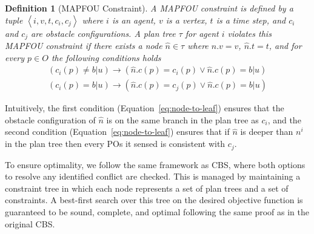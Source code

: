 \documentclass[letterpaper]{article} %
\newcommand{\unknown}{\textit{b}|\textit{u}}
\newcommand{\pos}{POs\xspace}
\newcommand{\tuple}[1]{\ensuremath{\left \langle #1 \right \rangle }}
\newtheorem{definition}{Definition}
\begin{document}
\begin{definition}[MAPFOU Constraint]
A MAPFOU constraint is defined by a tuple $\tuple{i,v,t,c_i,c_j}$
where $i$ is an agent,
$v$ is a vertex,
$t$ is a time step,
and $c_i$ and $c_j$ are obstacle configurations.
A plan tree $\tau$ for agent $i$ violates this MAPFOU constraint if there exists a node $\hat{n}\in\tau$ where $\hat{n}.v=v$,  $\hat{n}.t=t$, and for every $p\in O$ the following conditions holds
\begin{eqnarray}
\left(c_i(p)\neq\unknown\right)\rightarrow \left(\hat{n}.c(p)=c_i(p)\vee \hat{n}.c(p)=\unknown\right) \label{eq:root-to-node}
\\
\left(c_i(p)=\unknown\right)\rightarrow \left(\hat{n}.c(p)=c_j(p)\vee \hat{n}.c(p)=\unknown\right)  \label{eq:node-to-leaf}
\end{eqnarray}
\label{def:mapfou-constraint}
\end{definition}
Intuitively, the first condition (Equation~\ref{eq:node-to-leaf}) ensures that the obstacle configuration of $\hat{n}$ is on the same branch in the plan tree as $c_i$,
and the second condition (Equation~\ref{eq:node-to-leaf}) ensures that
if $\hat{n}$ is deeper than $n^i$ in the plan tree then every \pos it sensed is consistent with $c_j$.


To ensure optimality, we follow the same framework as CBS, where both options to resolve any identified conflict are checked. This is managed by maintaining a constraint tree in which each node represents a set of plan trees and a set of constraints. A best-first search over this tree on the desired objective function is guaranteed to be sound, complete, and optimal following the same proof as in the original CBS.
\end{document}
